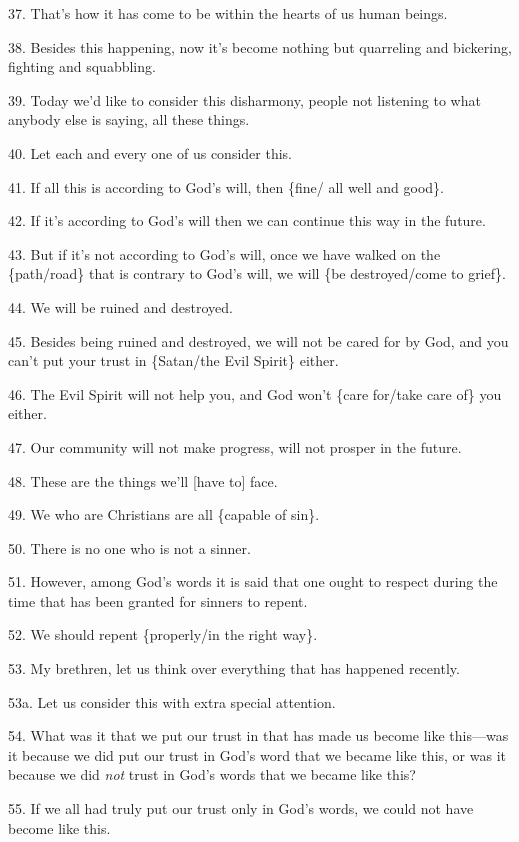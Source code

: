 37. That's how it has come to be within the hearts of us human beings.

38. Besides this happening, now it's become nothing but quarreling and bickering,
fighting and squabbling.

39. Today we'd like to consider this disharmony, people not listening to what anybody
else is saying, all these things.

40. Let each and every one of us consider this.

41. If all this is according to God's will, then \{fine/ all well and good\}.

42. If it's according to God's will then we can continue this way in the future.

43. But if it's not according to God's will, once we have walked on the \{path/road\}
that is contrary to God's will, we will \{be destroyed/come to grief\}.

44. We will be ruined and destroyed.

45. Besides being ruined and destroyed, we will not be cared for by God, and you
can't put your trust in \{Satan/the Evil Spirit\} either.

46. The Evil Spirit will not help you, and God won't \{care for/take care of\}
you either.

47. Our community will not make progress, will not prosper in the future.

48. These are the things we'll [have to] face.

49. We who are Christians are all \{capable of sin\}.

50. There is no one who is not a sinner.

51. However, among God's words it is said that one ought to respect during the
time that has been granted for sinners to repent.

52. We should repent \{properly/in the right way\}.

53. My brethren, let us think over everything that has happened recently.

53a. Let us consider this with extra special attention.

54. What was it that we put our trust in that has made us become like this---was
it because we did put our trust in God's word that we became like this, or was
it because we did \textit{not} trust in God's words that we became like this?

55. If we all had truly put our trust only in God's words, we could not have become
like this.


